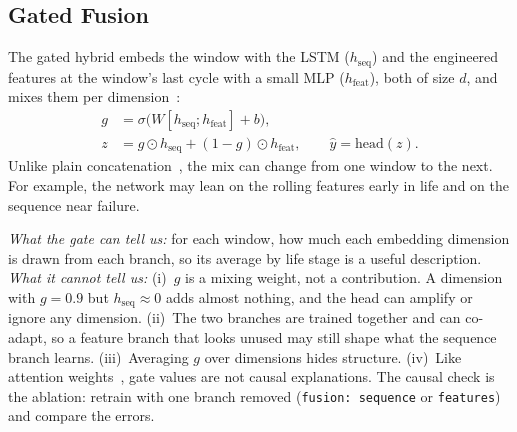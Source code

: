 \subsection{Gated Fusion}
The gated hybrid embeds the window with the LSTM ($h_{\mathrm{seq}}$) and the
engineered features at the window's last cycle with a small MLP
($h_{\mathrm{feat}}$), both of size $d$, and mixes them per
dimension~\cite{Arevalo2017gated}:
\begin{align}
g&=\sigma\bigl(W[h_{\mathrm{seq}};h_{\mathrm{feat}}]+b\bigr),\\
z&=g\odot h_{\mathrm{seq}}+(1-g)\odot h_{\mathrm{feat}},\qquad \hat y=\mathrm{head}(z).
\end{align}
Unlike plain concatenation~\cite{Chen2021machine,Jin2022bilstm}, the mix can
change from one window to the next. For example, the network may lean on the
rolling features early in life and on the sequence near failure.

\emph{What the gate can tell us:} for each window, how much each embedding
dimension is drawn from each branch, so its average by life stage is a
useful description. \emph{What it cannot tell us:}
(i)~$g$ is a mixing weight, not a contribution. A dimension with $g=0.9$ but
$h_{\mathrm{seq}}\approx0$ adds almost nothing, and the head can amplify or
ignore any dimension.
(ii)~The two branches are trained together and can co-adapt, so a feature
branch that looks unused may still shape what the sequence branch learns.
(iii)~Averaging $g$ over dimensions hides structure.
(iv)~Like attention weights~\cite{Jain2019attention}, gate values are not
causal explanations. The causal check is the ablation: retrain with one
branch removed (\texttt{fusion: sequence} or \texttt{features}) and compare
the errors.

